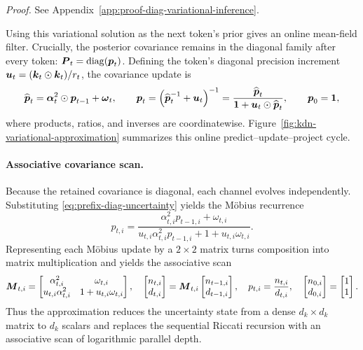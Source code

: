 \documentclass[11pt,letterpaper,logo]{yalearxiv}
\begin{document}
\noindent\textit{Proof.} See Appendix~\ref{app:proof-diag-variational-inference}.

Using this variational solution as the next token's prior gives an online mean-field filter.
Crucially, the posterior covariance remains in the diagonal family after every token:
$\boldsymbol{P}_t=\operatorname{diag}(\boldsymbol{p}_t)$. Defining the token's diagonal precision increment
$\boldsymbol{u}_t=(\boldsymbol{k}_t\odot\boldsymbol{k}_t)/r_t$, the covariance update is
\begin{equation}
  \widehat{\boldsymbol{p}}_t
  =\boldsymbol{\alpha}_t^2\odot\boldsymbol{p}_{t-1}+\boldsymbol{\omega}_t,
  \qquad
  \boldsymbol{p}_t
  =\left(\widehat{\boldsymbol{p}}_t^{-1}+\boldsymbol{u}_t\right)^{-1}
  =\frac{\widehat{\boldsymbol{p}}_t}
    {\boldsymbol{1}+\boldsymbol{u}_t\odot\widehat{\boldsymbol{p}}_t},
  \qquad
  \boldsymbol{p}_0=\boldsymbol{1},
  \label{eq:prefix-diag-uncertainty}
\end{equation}
where products, ratios, and inverses are coordinatewise. Figure~\ref{fig:kdn-variational-approximation}
summarizes this online predict--update--project cycle.

\paragraph{Associative covariance scan.}
Because the retained covariance is diagonal, each channel evolves independently. Substituting
\eqref{eq:prefix-diag-uncertainty} yields the M\"obius recurrence
\begin{equation}
  p_{t,i}
  =\frac{\alpha_{t,i}^2p_{t-1,i}+\omega_{t,i}}
    {u_{t,i}\alpha_{t,i}^2p_{t-1,i}+1+u_{t,i}\omega_{t,i}}.
  \label{eq:diag-cov-mobius}
\end{equation}
Representing each M\"obius update by a $2\times2$ matrix turns composition into matrix
multiplication and yields the associative scan
\begin{equation}
  \begin{gathered}
    \boldsymbol{M}_{t,i}
    =\begin{bmatrix}
      \alpha_{t,i}^2 & \omega_{t,i}\\
      u_{t,i}\alpha_{t,i}^2 & 1+u_{t,i}\omega_{t,i}
    \end{bmatrix},
    \quad
    \begin{bmatrix}n_{t,i}\\d_{t,i}\end{bmatrix}
    =\boldsymbol{M}_{t,i}
      \begin{bmatrix}n_{t-1,i}\\d_{t-1,i}\end{bmatrix},
    \quad
    p_{t,i}=\frac{n_{t,i}}{d_{t,i}},
    \quad
    \begin{bmatrix}n_{0,i}\\d_{0,i}\end{bmatrix}
    =\begin{bmatrix}1\\1\end{bmatrix}.
  \end{gathered}
  \label{eq:diag-cov-scan}
\end{equation}
Thus the approximation reduces the uncertainty state from a dense $d_k\times d_k$ matrix to
$d_k$ scalars and replaces the sequential Riccati recursion with an associative scan of
logarithmic parallel depth.
\end{document}
